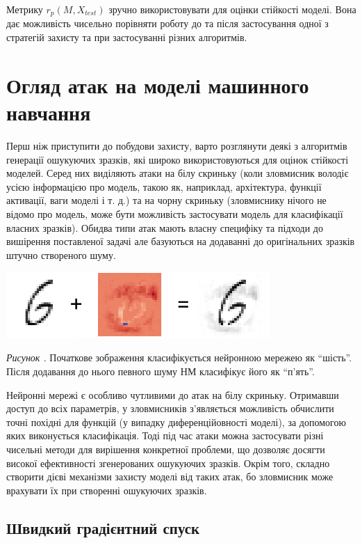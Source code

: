 \documentclass[14pt,a4paper]{extarticle}
\newcounter{e}
\newcounter{pic}
\newcommand{\pic}[1]{\refstepcounter{pic} \vspace{-0.3cm}\textit{Рисунок \arabic{pic}\label{#1}.}}
\numberwithin{equation}{section}
\numberwithin{figure}{section}
\begin{document}
 Метрику $r_p(M, X_{test})$ зручно використовувати для оцінки стійкості моделі. Вона дає можливість чисельно порівняти роботу до та після застосування одної з стратегій захисту та при застосуванні різних алгоритмів. 
 
 \newpage
 \thispagestyle{empty}
 \section{Огляд атак на моделі машинного навчання}
 
 Перш ніж приступити до побудови захисту, варто розглянути деякі з алгоритмів генерації ошукуючих зразків, які широко використовуються для оцінок стійкості моделей. Серед них виділяють атаки на білу скриньку (коли зловмисник володіє усією інформацією про модель, такою як, наприклад, архітектура, функції активації, ваги моделі і т. д.) та на чорну скриньку (зловмиснику нічого не відомо про модель, може бути можливість застосувати модель для класифікації власних зразків). Обидва типи атак мають власну специфіку та підходи до вишірення поставленої задачі але базуються на додаванні до оригінальних зразків штучно створеного шуму.


 \begin{center}
	\includegraphics[width=10cm]{../images/six.png}
 \end{center}
 \begin{center}
	\pic{six}
	Початкове зображення класифікується нейронною мережею як ``шість''. Після додавання до нього певного шуму НМ класифікує його як ``п'ять''.
 \end{center}

 Нейронні мережі є особливо чутливими до атак на білу скриньку. Отримавши доступ до всіх параметрів, у зловмисників з'являється можливість обчислити точні похідні для функцій (у випадку диференційовності моделі), за допомогою яких виконується класифікація. Тоді під час атаки можна застосувати різні чисельні методи для вирішення конкретної проблеми, що дозволяє досягти високої ефективності згенерованих ошукуючих зразків. Окрім того, складно створити дієві механізми захисту моделі від таких атак, бо зловмисник може врахувати їх при створенні ошукуючих зразків. 

 \subsection{Швидкий градієнтний спуск}
\end{document}
